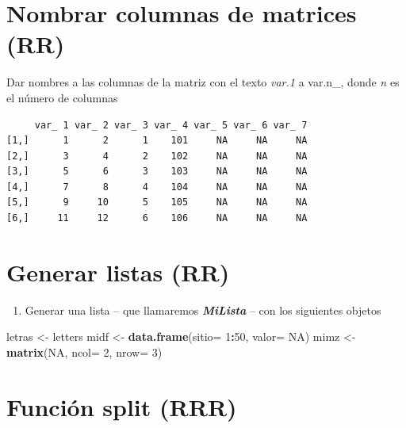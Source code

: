 \documentclass[]{book}
\newenvironment{Shaded}{\begin{snugshade}}{\end{snugshade}}
\newcommand{\DataTypeTok}[1]{\textcolor[rgb]{0.13,0.29,0.53}{#1}}
\newcommand{\DecValTok}[1]{\textcolor[rgb]{0.00,0.00,0.81}{#1}}
\newcommand{\KeywordTok}[1]{\textcolor[rgb]{0.13,0.29,0.53}{\textbf{#1}}}
\newcommand{\NormalTok}[1]{#1}
\newcommand{\OperatorTok}[1]{\textcolor[rgb]{0.81,0.36,0.00}{\textbf{#1}}}
\newcommand{\OtherTok}[1]{\textcolor[rgb]{0.56,0.35,0.01}{#1}}
\newcommand{\StringTok}[1]{\textcolor[rgb]{0.31,0.60,0.02}{#1}}
\providecommand{\tightlist}{%
  \setlength{\itemsep}{0pt}\setlength{\parskip}{0pt}}
\begin{document}
\hypertarget{nombrar-columnas-de-matrices-rr}{%
\section{Nombrar columnas de matrices (RR)}\label{nombrar-columnas-de-matrices-rr}}

Dar nombres a las columnas de la matriz con el texto \emph{var.1} a var.n\_, donde \emph{n} es el número de columnas

\begin{verbatim}
     var_ 1 var_ 2 var_ 3 var_ 4 var_ 5 var_ 6 var_ 7
[1,]      1      2      1    101     NA     NA     NA
[2,]      3      4      2    102     NA     NA     NA
[3,]      5      6      3    103     NA     NA     NA
[4,]      7      8      4    104     NA     NA     NA
[5,]      9     10      5    105     NA     NA     NA
[6,]     11     12      6    106     NA     NA     NA
\end{verbatim}

\hypertarget{generar-listas-rr}{%
\section{Generar listas (RR)}\label{generar-listas-rr}}

\begin{enumerate}
\def\labelenumi{\arabic{enumi}.}
\tightlist
\item
  Generar una lista -- que llamaremos \textbf{\emph{MiLista}} -- con los siguientes objetos
\end{enumerate}

\begin{Shaded}
\begin{Highlighting}[]
\NormalTok{letras <-}\StringTok{ }\NormalTok{letters}
\NormalTok{midf <-}\StringTok{ }\KeywordTok{data.frame}\NormalTok{(}\DataTypeTok{sitio=} \DecValTok{1}\OperatorTok{:}\DecValTok{50}\NormalTok{, }\DataTypeTok{valor=} \OtherTok{NA}\NormalTok{)}
\NormalTok{mimz <-}\StringTok{ }\KeywordTok{matrix}\NormalTok{(}\OtherTok{NA}\NormalTok{, }\DataTypeTok{ncol=} \DecValTok{2}\NormalTok{, }\DataTypeTok{nrow=} \DecValTok{3}\NormalTok{)}
\end{Highlighting}
\end{Shaded}

\hypertarget{funciuxf3n-split-rrr}{%
\section{Función split (RRR)}\label{funciuxf3n-split-rrr}}
\end{document}
